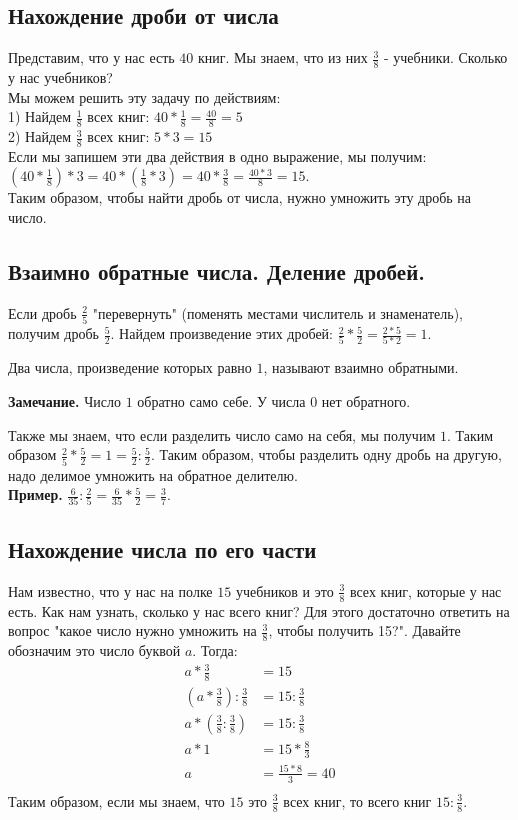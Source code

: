 \documentclass{article}
\begin{document}
\subsection{Нахождение дроби от числа}
Представим, что у нас есть $40$ книг. Мы знаем, что из них $\frac38$ - учебники. Сколько у нас учебников?\\
Мы можем решить эту задачу по действиям:\\
1) Найдем $\frac18$ всех книг: $40 * \frac18 = \frac{40}8 = 5$\\
2) Найдем $\frac38$ всех книг: $5 * 3 = 15$\\

Если мы запишем эти два действия в одно выражение, мы получим: $(40 * \frac18) * 3 = 40 * (\frac18 * 3) = 40 * \frac38 = \frac{40*3}8 = 15$.\\
Таким образом, чтобы найти дробь от числа, нужно умножить эту дробь на число.\\
\subsection{Взаимно обратные числа. Деление дробей.}
Если дробь $\frac25$ "перевернуть" (поменять местами числитель и знаменатель), получим дробь $\frac52$. Найдем произведение этих дробей: $\frac25 * \frac52 = \frac{2*5}{5*2} = 1$. 
\begin{Def}
Два числа, произведение которых равно $1$, называют взаимно обратными.
\end{Def}
\textbf{Замечание.} Число $1$ обратно само себе. У числа $0$ нет обратного.

Также мы знаем, что если разделить число само на себя, мы получим $1$. 
Таким образом $\frac25 * \frac52 = 1 = \frac52 : \frac52$. Таким образом, чтобы разделить одну дробь на другую, надо делимое умножить на обратное делителю.\\

\textbf{Пример.} $\frac6{35} : \frac25 = \frac6{35} * \frac52 = \frac37$.

\subsection{Нахождение числа по его части}
Нам известно, что у нас на полке $15$ учебников и это $\frac38$ всех книг, которые у нас есть. Как нам узнать, сколько у нас всего книг? Для этого достаточно ответить на вопрос "какое число нужно умножить на $\frac38$, чтобы получить 15?". Давайте обозначим это число буквой $a$. Тогда:
\begin{align*}
    a*\frac38 &= 15\\
    (a*\frac38) : \frac38 &= 15 : \frac38\\
    a * (\frac38 : \frac38) &= 15 : \frac38\\
    a * 1 &= 15 * \frac83\\
    a &= \frac{15*8}3 = 40\\
\end{align*}
Таким образом, если мы знаем, что $15$ это $\frac38$ всех книг, то всего книг $15 : \frac38$.
\newpage
\end{document}
